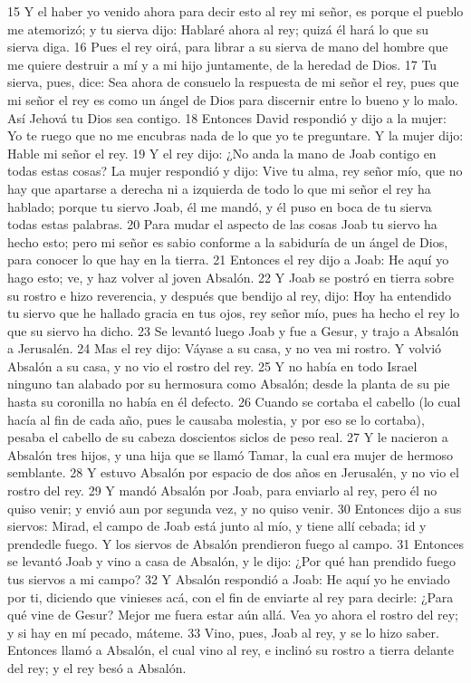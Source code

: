 15 Y el haber yo venido ahora para decir esto al rey mi señor, es porque el pueblo me atemorizó; y tu sierva dijo: Hablaré ahora al rey; quizá él hará lo que su sierva diga.
16 Pues el rey oirá, para librar a su sierva de mano del hombre que me quiere destruir a mí y a mi hijo juntamente, de la heredad de Dios.
17 Tu sierva, pues, dice: Sea ahora de consuelo la respuesta de mi señor el rey, pues que mi señor el rey es como un ángel de Dios para discernir entre lo bueno y lo malo. Así Jehová tu Dios sea contigo.
18 Entonces David respondió y dijo a la mujer: Yo te ruego que no me encubras nada de lo que yo te preguntare. Y la mujer dijo: Hable mi señor el rey.
19 Y el rey dijo: ¿No anda la mano de Joab contigo en todas estas cosas? La mujer respondió y dijo: Vive tu alma, rey señor mío, que no hay que apartarse a derecha ni a izquierda de todo lo que mi señor el rey ha hablado; porque tu siervo Joab, él me mandó, y él puso en boca de tu sierva todas estas palabras.
20 Para mudar el aspecto de las cosas Joab tu siervo ha hecho esto; pero mi señor es sabio conforme a la sabiduría de un ángel de Dios, para conocer lo que hay en la tierra.
21 Entonces el rey dijo a Joab: He aquí yo hago esto; ve, y haz volver al joven Absalón.
22 Y Joab se postró en tierra sobre su rostro e hizo reverencia, y después que bendijo al rey, dijo: Hoy ha entendido tu siervo que he hallado gracia en tus ojos, rey señor mío, pues ha hecho el rey lo que su siervo ha dicho.
23 Se levantó luego Joab y fue a Gesur, y trajo a Absalón a Jerusalén.
24 Mas el rey dijo: Váyase a su casa, y no vea mi rostro. Y volvió Absalón a su casa, y no vio el rostro del rey.
25 Y no había en todo Israel ninguno tan alabado por su hermosura como Absalón; desde la planta de su pie hasta su coronilla no había en él defecto.
26 Cuando se cortaba el cabello (lo cual hacía al fin de cada año, pues le causaba molestia, y por eso se lo cortaba), pesaba el cabello de su cabeza doscientos siclos   de peso real.
27 Y le nacieron a Absalón tres hijos, y una hija que se llamó Tamar, la cual era mujer de hermoso semblante.
28 Y estuvo Absalón por espacio de dos años en Jerusalén, y no vio el rostro del rey.
29 Y mandó Absalón por Joab, para enviarlo al rey, pero él no quiso venir; y envió aun por segunda vez, y no quiso venir.
30 Entonces dijo a sus siervos: Mirad, el campo de Joab está junto al mío, y tiene allí cebada; id y prendedle fuego. Y los siervos de Absalón prendieron fuego al campo.
31 Entonces se levantó Joab y vino a casa de Absalón, y le dijo: ¿Por qué han prendido fuego tus siervos a mi campo?
32 Y Absalón respondió a Joab: He aquí yo he enviado por ti, diciendo que vinieses acá, con el fin de enviarte al rey para decirle: ¿Para qué vine de Gesur? Mejor me fuera estar aún allá. Vea yo ahora el rostro del rey; y si hay en mí pecado, máteme.
33 Vino, pues, Joab al rey, y se lo hizo saber. Entonces llamó a Absalón, el cual vino al rey, e inclinó su rostro a tierra delante del rey; y el rey besó a Absalón.

